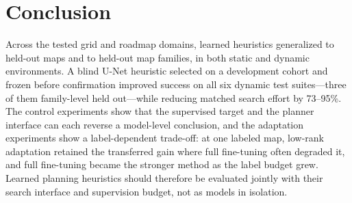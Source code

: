 \documentclass[letterpaper]{article} %
\begin{document}
\section{Conclusion}

Across the tested grid and roadmap domains, learned heuristics generalized to held-out maps and to held-out map families, in both static and dynamic environments. A blind U-Net heuristic selected on a development cohort and frozen before confirmation improved success on all six dynamic test suites---three of them family-level held out---while reducing matched search effort by 73--95\%. The control experiments show that the supervised target and the planner interface can each reverse a model-level conclusion, and the adaptation experiments show a label-dependent trade-off: at one labeled map, low-rank adaptation retained the transferred gain where full fine-tuning often degraded it, and full fine-tuning became the stronger method as the label budget grew. Learned planning heuristics should therefore be evaluated jointly with their search interface and supervision budget, not as models in isolation.



\end{document}
